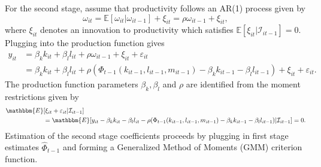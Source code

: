 \documentclass[12pt]{article}
\begin{document}
For the second stage, assume that productivity follows an AR(1) process given by
\begin{equation}
\omega_{it}=\mathbb{E}[\omega_{it}|\omega_{it-1}]+\xi_{it}=\rho\omega_{it-1}+\xi_{it},
\end{equation}
where $\xi_{it}$ denotes an innovation to productivity which satisfies $\mathbb{E}[\xi_{it}|\mathcal{I}_{it-1}]=0$. Plugging into the production function gives
\begin{equation*}
\begin{split}
y_{it}&=\beta_{k}k_{it}+\beta_{l}l_{it}+\rho\omega_{it-1}+\xi_{it}+\varepsilon_{it}\\
&=\beta_{k}k_{it}+\beta_{l}l_{it}+\rho(\Phi_{t-1}(k_{it-1}, l_{it-1}, m_{it-1})-\beta_{k}k_{it-1}-\beta_{l}l_{it-1})+\xi_{it}+\varepsilon_{it}.
\end{split}
\end{equation*}
The production function parameters $\beta_{k}, \beta_{l}$ and $\rho$ are identified from the moment restrictions given by
\begin{equation}\label{2ndstagemoment}
\begin{split}
\mathbbm{E}&[\xi_{it}+\varepsilon_{it}|\mathcal{I}_{it-1}]\\
&=\mathbbm{E}[y_{it}-\beta_{k}k_{it}-\beta_{l}l_{it}-\rho(\Phi_{t-1}(k_{it-1}, l_{it-1}, m_{it-1})-\beta_{k}k_{it-1}-\beta_{l}l_{it-1})|\mathcal{I}_{it-1}]=0.
\end{split}
\end{equation}
Estimation of the second stage coefficients proceeds by plugging in first stage estimates $\hat{\Phi}_{t-1}$ and forming a Generalized Method of Moments (GMM) criterion function.
\end{document}
